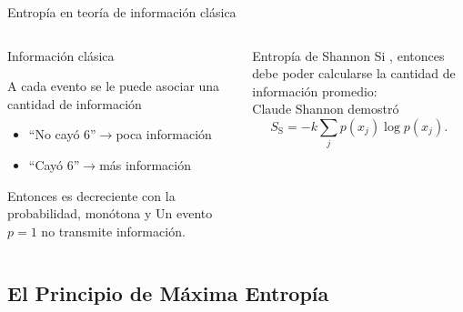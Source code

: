 \begin{frame}{Entropía en teoría de información clásica}
    \begin{columns}
        \begin{column}{0.5\textwidth}
            \begin{block}{Información clásica}
            \begin{center}
                A cada evento se le puede asociar una cantidad de información\pause
            \end{center}
            \begin{itemize}
                \item ``No cayó 6''$\rightarrow$poca información\pause
                \item ``Cayó 6''$\rightarrow$más información\pause
            \end{itemize}
            Entonces es decreciente con la probabilidad, monótona y Un evento $p=1$ no transmite información.
        \end{block}
        \end{column}
        \pause
        \begin{column}{0.5\textwidth}
            \begin{block}{Entropía de Shannon}
            Si , entonces debe poder calcularse la cantidad de información promedio:\\
            \pause
            Claude Shannon demostró 
            \begin{equation}
                S_{\text{S}}=-k\sum_{j}p(x_{j})\log{p(x_{j})}.\nonumber
            \end{equation}
        \end{block}
        \end{column}
    \end{columns}
\end{frame}

\subsection{El Principio de Máxima Entropía}


